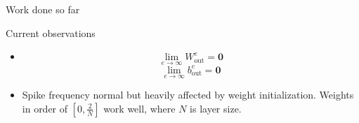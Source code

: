 \documentclass[t]{beamer}
\begin{document}
\begin{frame}{Work done so far}
\end{frame}


\begin{frame}{Current observations}

\begin{itemize}[label=--]
\item \[\lim_{e \to \infty} W^e_\textrm{out}  = \mathbf{0}\]
\[\lim_{e \to \infty} b^e_\textrm{out}  = \mathbf{0}\]
\item Spike frequency normal but heavily affected by weight initialization. Weights in order of $[0, \frac{2}{N}]$ work well, where $N$ is layer size.
\end{itemize}
\end{frame}
\end{document}
